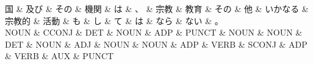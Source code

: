 \documentclass[tikz,border=5pt]{standalone}
\begin{document}
\normalsize
\begin{dependency}[edge unit distance=12.0pt]
    \begin{deptext}[column sep=1em]
        国 \& 及び \& その \& 機関 \& は \& 、 \& 宗教 \& 教育 \& その \& 他 \& いかなる \& 宗教的 \& 活動 \& も \& し \& て \& は \& なら \& ない \& 。\\
        NOUN \& CCONJ \& DET \& NOUN \& ADP \& PUNCT \& NOUN \& NOUN \& DET \& NOUN \& ADJ \& NOUN \& NOUN \& ADP \& VERB \& SCONJ \& ADP \& VERB \& AUX \& PUNCT\\
    \end{deptext}
\end{dependency}
\end{document}
